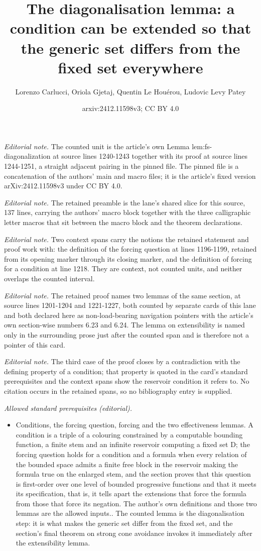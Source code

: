 \documentclass{article}
\title{The diagonalisation lemma: a condition can be extended so that the generic set differs from the fixed set everywhere}
\author{Lorenzo Carlucci, Oriola Gjetaj, Quentin Le Houérou, Ludovic Levy Patey}
\date{arxiv:2412.11598v3; CC BY 4.0}
\begin{document}
\maketitle
\noindent\textit{Editorial note.} The counted unit is the article's own Lemma lem:fs-diagonalization at source lines 1240-1243 together with its proof at source lines 1244-1251, a straight adjacent pairing in the pinned file. The pinned file is a concatenation of the authors' main and macro files; it is the article's fixed version arXiv:2412.11598v3 under CC BY 4.0.\par\medskip
\noindent\textit{Editorial note.} The retained preamble is the lane's shared slice for this source, 137 lines, carrying the authors' macro block together with the three calligraphic letter macros that sit between the macro block and the theorem declarations.\par\medskip
\noindent\textit{Editorial note.} Two context spans carry the notions the retained statement and proof work with: the definition of the forcing question at lines 1196-1199, retained from its opening marker through its closing marker, and the definition of forcing for a condition at line 1218. They are context, not counted units, and neither overlaps the counted interval.\par\medskip
\noindent\textit{Editorial note.} The retained proof names two lemmas of the same section, at source lines 1201-1204 and 1221-1227, both counted by separate cards of this lane and both declared here as non-load-bearing navigation pointers with the article's own section-wise numbers 6.23 and 6.24. The lemma on extensibility is named only in the surrounding prose just after the counted span and is therefore not a pointer of this card.\par\medskip
\noindent\textit{Editorial note.} The third case of the proof closes by a contradiction with the defining property of a condition; that property is quoted in the card's standard prerequisites and the context spans show the reservoir condition it refers to. No citation occurs in the retained spans, so no bibliography entry is supplied.\par\medskip
\noindent\textit{Allowed standard prerequisites (editorial).}\begin{itemize}
\item Conditions, the forcing question, forcing and the two effectiveness lemmas. A condition is a triple of a colouring constrained by a computable bounding function, a finite stem and an infinite reservoir computing a fixed set D; the forcing question holds for a condition and a formula when every relation of the bounded space admits a finite free block in the reservoir making the formula true on the enlarged stem, and the section proves that this question is first-order over one level of bounded progressive functions and that it meets its specification, that is, it tells apart the extensions that force the formula from those that force its negation. The author's own definitions and those two lemmas are the allowed inputs.. The counted lemma is the diagonalisation step: it is what makes the generic set differ from the fixed set, and the section's final theorem on strong cone avoidance invokes it immediately after the extensibility lemma.
\end{itemize}\medskip
\end{document}

